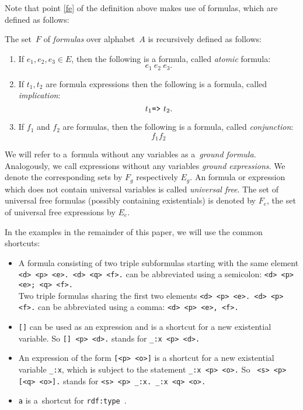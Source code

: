 Note that point \ref{fe} of the definition above makes use of formulas, which are defined as follows:

\begin{definition}
    \label{formula}
    The set~$F$ of \textit{\nthree formulas} over alphabet~$A$ is recursively defined as follows:
    \begin{enumerate}  
      \item \label{1} If $e_1, e_2, e_3 \in E$, then the following is a formula, called \textit{atomic} formula: \[e_1~ e_2~ e_3.\] 
      \item \label{2} If $t_1, t_2$ are formula expressions then the following is a formula, called \mbox{\textit{implication}}: \[t_{1} \verb!=>!~t_{2}.\] 
      \item \label{n} If $f_1$ and $f_2$ are formulas, then the following is a formula, called \textit{conjunction}: \[f_1 f_2\] 
    \end{enumerate}
\end{definition}

We will refer to a~formula without any variables as a~\textit{ground formula}.
Analogously, we call expressions without any variables \textit{ground expressions}.
We denote the corresponding sets by $F_g$ respectively $E_g$. 
An formula or expression which does not contain universal variables is called \emph{universal free}. 
The set of universal free formulas (possibly containing existentials) is denoted by $F_e$, the set of universal free expressions by $E_e$.

In the examples in the remainder of this paper, we will use the common \rdf shortcuts:

\begin{remark}
\begin{itemize}
\item A formula consisting of two triple subformulas starting with the same element \verb!<d> <p> <e>. <d> <q> <f>.! can be abbreviated using a semicolon: \verb!<d> <p> <e>; <q> <f>.!\\ 
Two triple formulas sharing the first two elements  \verb!<d> <p> <e>. <d> <p> <f>.! can be abbreviated using a comma: \verb!<d> <p> <e>, <f>.!
  \item \verb![]! can be used as an expression and is a shortcut for a new existential variable. So \verb![] <p> <d>.! stands for \verb!_:x <p> <d>.!
 \item An expression of the form \verb![<p> <o>]! is a shortcut for a new existential variable \verb!_:x!,
   which is subject to the statement \verb!_:x <p> <o>.!
   So \verb! <s> <p> [<q> <o>].! stands for \verb!<s> <p> _:x. _:x <q> <o>.!
 \item \verb!a! is a~shortcut for \verb!rdf:type!~\cite{RDF}.
 \end{itemize}
\end{remark}

